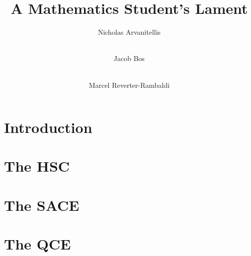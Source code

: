 \documentclass[11pt]{report}
\title{A Mathematics Student's Lament}
\author[1]{Nicholas Arvanitellis}
\author[2]{\\Jacob Bos}
\author[3]{\\Marcel Reverter-Rambaldi}
\affil[1,2,3]{Australian National University}
\affil[3]{The University of Queensland}
\begin{document}
    \maketitle
    \tableofcontents
\newpage
{}

\chapter{Introduction}




\chapter{The HSC}




\chapter{The SACE}


\chapter{The QCE}


\end{document}

